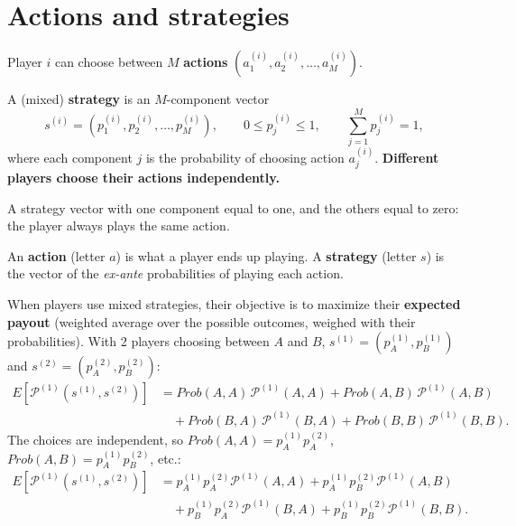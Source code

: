 \documentclass[11pt,a4paper,openany]{book}
\begin{document}
\section{Actions and strategies}

Player $i$ can choose between $M$ \textbf{actions} $(a_1^{(i)}, a_2^{(i)}, \ldots,
a_M^{(i)})$.

\begin{defnbox}[title=Mixed strategy]
A (mixed) \textbf{strategy} is an $M$-component vector
\[
s^{(i)} = (p_1^{(i)}, p_2^{(i)}, \ldots, p_M^{(i)}), \qquad 0 \le p_j^{(i)} \le 1, \qquad
\sum_{j=1}^{M} p_j^{(i)} = 1,
\]
where each component $j$ is the probability of choosing action $a_j^{(i)}$.
\textbf{Different players choose their actions independently.}
\end{defnbox}

\begin{defnbox}[title=Pure strategy]
A strategy vector with one component equal to one, and the others equal to zero: the player
always plays the same action.
\end{defnbox}

\begin{warnbox}[title=Action $\ne$ strategy]
An \textbf{action} (letter $a$) is what a player ends up playing. A \textbf{strategy}
(letter $s$) is the vector of the \emph{ex-ante} probabilities of playing each action.
\end{warnbox}


\begin{propbox}[title=Expected payout]
When players use mixed strategies, their objective is to maximize their \textbf{expected
payout} (weighted average over the possible outcomes, weighed with their probabilities).
With 2 players choosing between $A$ and $B$, $s^{(1)} = (p_A^{(1)}, p_B^{(1)})$ and
$s^{(2)} = (p_A^{(2)}, p_B^{(2)})$:
\begin{align*}
E[\mathcal{P}^{(1)}(s^{(1)}, s^{(2)})]
&= Prob(A,A)\,\mathcal{P}^{(1)}(A,A) + Prob(A,B)\,\mathcal{P}^{(1)}(A,B) \\
&\quad + Prob(B,A)\,\mathcal{P}^{(1)}(B,A) + Prob(B,B)\,\mathcal{P}^{(1)}(B,B).
\end{align*}
The choices are independent, so $Prob(A,A) = p_A^{(1)} p_A^{(2)}$,
$Prob(A,B) = p_A^{(1)} p_B^{(2)}$, etc.:
\begin{align*}
E[\mathcal{P}^{(1)}(s^{(1)}, s^{(2)})]
&= p_A^{(1)} p_A^{(2)} \mathcal{P}^{(1)}(A,A) + p_A^{(1)} p_B^{(2)} \mathcal{P}^{(1)}(A,B) \\
&\quad + p_B^{(1)} p_A^{(2)} \mathcal{P}^{(1)}(B,A) + p_B^{(1)} p_B^{(2)} \mathcal{P}^{(1)}(B,B).
\end{align*}
\end{propbox}
\end{document}
